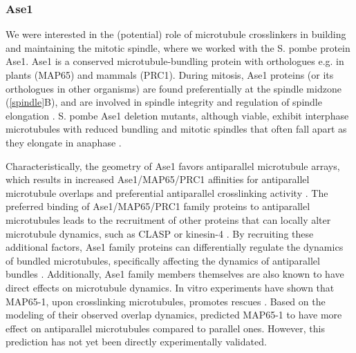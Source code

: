 \subsubsection{Ase1}
\label{sec:Ase1_intro}
We were interested in the (potential) role of microtubule crosslinkers in building and maintaining the mitotic spindle, where we worked with the S. pombe protein Ase1. Ase1 is a conserved microtubule-bundling protein with orthologues e.g. in plants (MAP65) and mammals (PRC1). During mitosis, Ase1 proteins (or its orthologues in other organisms) are found preferentially at the spindle midzone (\autoref{spindle}B), and are involved in spindle integrity and regulation of spindle elongation \parencite{Loiodice2005,Yamashita2005,She2019}. S. pombe Ase1 deletion mutants, although viable, exhibit interphase microtubules with reduced bundling and mitotic spindles that often fall apart as they elongate in anaphase \parencite{Loiodice2005,Yamashita2005}. \par
Characteristically, the geometry of Ase1 favors antiparallel microtubule arrays, which results in increased Ase1/MAP65/PRC1 affinities for antiparallel microtubule overlaps and preferential antiparallel crosslinking activity \parencite{She2019,Bieling2010,Janson2007,Subramanian2010,Kellogg2016,Gaillard2008}. The preferred binding of Ase1/MAP65/PRC1 family proteins to antiparallel microtubules leads to the recruitment of other proteins that can locally alter microtubule dynamics, such as CLASP \parencite{Bratman2007b,Liu2009,Kitazawa2014} or kinesin-4 \parencite{Bieling2010, Mani2021}. By recruiting these additional factors, Ase1 family proteins can differentially regulate the dynamics of bundled microtubules, specifically affecting the dynamics of antiparallel bundles \parencite{Bieling2010,Bratman2007b, Mani2021}. Additionally, Ase1 family members themselves are also known to have direct effects on microtubule dynamics. In vitro experiments have shown that MAP65-1, upon crosslinking microtubules, promotes rescues \parencite{Stoppin-Mellet2013}. Based on the modeling of their observed overlap dynamics, \cite{Stoppin-Mellet2013} predicted MAP65-1 to have more effect on antiparallel microtubules compared to parallel ones. However, this prediction has not yet been directly experimentally validated.\par
